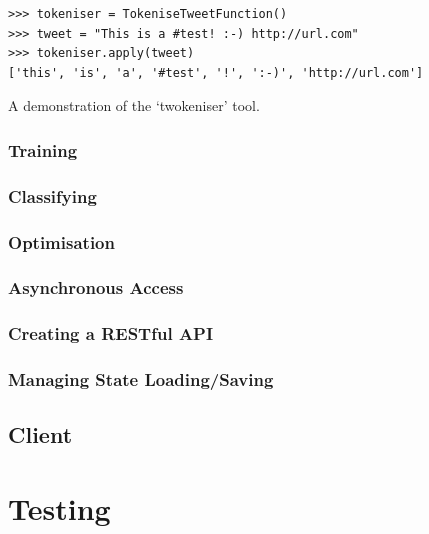 \documentclass[11pt,a4paper]{report}
\begin{document}
\begin{listing}[htpb]
    \begin{verbatim}
>>> tokeniser = TokeniseTweetFunction()
>>> tweet = "This is a #test! :-) http://url.com"
>>> tokeniser.apply(tweet)
['this', 'is', 'a', '#test', '!', ':-)', 'http://url.com']
    \end{verbatim}
    \caption{A demonstration of the `twokeniser' tool.}
    \label{lst:twokeniser}
\end{listing}


\subsection{Training}

\subsection{Classifying}

\subsection{Optimisation}

\subsection{Asynchronous Access}

\subsection{Creating a RESTful API}

\subsection{Managing State Loading/Saving}

\section{Client}

\pagebreak

\chapter{Testing}
\label{chap:testing}
\end{document}
